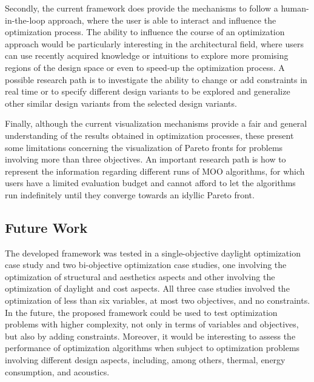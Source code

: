 Secondly, the current framework does provide the mechanisms to follow a human-in-the-loop approach, where the user is able to interact and influence the optimization process. The ability to influence the course of an optimization approach would be particularly interesting in the architectural field, where users can use recently acquired knowledge or intuitions to explore more promising regions of the design space or even to speed-up the optimization process. A possible research path is to investigate the ability to change or add constraints in real time or to specify different design variants to be explored and generalize other similar design variants from the selected design variants.

Finally, although the current visualization mechanisms provide a fair and general understanding of the results obtained in optimization processes, these present some limitations concerning the visualization of Pareto fronts for problems involving more than three objectives. An important research path is how to represent the information regarding different runs of \ac{MOO} algorithms, for which users have a limited evaluation budget and cannot afford to let the algorithms run indefinitely until they converge towards an idyllic Pareto front. %


\subsection{Future Work}
The developed framework was tested in a single-objective daylight optimization case study and two bi-objective optimization case studies, one involving the optimization of structural and aesthetics aspects and other involving the optimization of daylight and cost aspects. All three case studies involved the optimization of less than six variables, at most two objectives, and no constraints. In the future, the proposed framework could be used to test optimization problems with higher complexity, not only in terms of variables and objectives, but also by adding constraints. Moreover, it would be interesting to assess the performance of optimization algorithms when subject to optimization problems involving different design aspects, including, among others, thermal, energy consumption, and acoustics. 
 
